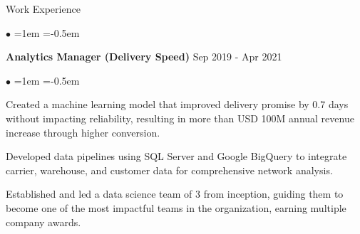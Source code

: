 \documentclass{resume}
\begin{document}
\begin{rSection}{Work Experience}
\begin{list}{\tiny$\bullet$}{ %
                \leftmargin=1em
                \itemsep=-0.5em
                \vspace{-0.5em}
            }
                        \end{list}
            \vspace{0.1em}
                    {\textbf{Analytics Manager (Delivery Speed)}} \hfill {Sep 2019 - Apr 2021}
            \\ %
            {} \hfill {}
            \begin{list}{\tiny$\bullet$}{ %
                \leftmargin=1em
                \itemsep=-0.5em
                \vspace{-0.5em}
            }
                            \item Created a machine learning model that improved delivery promise by 0.7 days without impacting reliability, resulting in more than USD 100M annual revenue increase through higher conversion.
                            \item Developed data pipelines using SQL Server and Google BigQuery to integrate carrier, warehouse, and customer data for comprehensive network analysis.
                            \item Established and led a data science team of 3 from inception, guiding them to become one of the most impactful teams in the organization, earning multiple company awards.
                        \end{list}
            \vspace{0.1em}
            \end{rSection}
\end{document}
